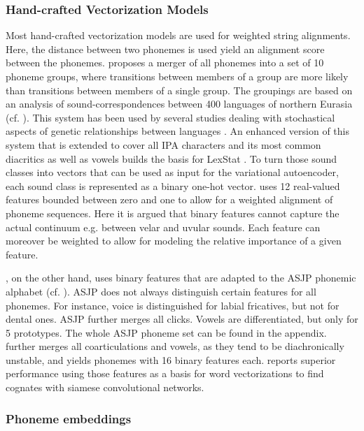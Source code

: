 \documentclass[6pt]{article}
\begin{document}
\subsubsection{Hand-crafted Vectorization Models}

Most hand-crafted vectorization models are used for weighted string alignments. Here, the distance between two phonemes is used yield an alignment score between the phonemes. \cite{dolgopolsky1986probabilistic} proposes a merger of all phonemes into a set of 10 phoneme groups, where transitions between  members of a group are more likely than transitions between members of a single group. The groupings are based on an analysis of sound-correspondences between 400 languages of northern Eurasia (cf. \cite[p. 119]{list2012lexstat}). This system has been used by several studies dealing with stochastical aspects of genetic relationships between languages \citep{baxter2000beyond,mortarino2009improved,turchin2010analyzing}. An enhanced version of this system that is extended to cover all IPA characters and its most common diacritics as well as vowels builds the basis for LexStat \citep{list2012sca,list2012lexstat}. To turn those sound classes into vectors that can be used as input for the variational autoencoder, each sound class is represented as a binary one-hot vector. \cite{kondrak2000new} uses 12 real-valued features bounded between zero and one to allow for a weighted alignment of phoneme sequences. Here it is argued that binary features cannot capture the actual continuum e.g. between velar and uvular sounds. Each feature can moreover be weighted to allow for modeling the relative importance of a given feature.


\cite{rama2016siamese}, on the other hand,  uses binary features that are adapted to the ASJP phonemic alphabet (cf. \cite{wichmann2010asjp}). ASJP does not always distinguish certain features for all phonemes. For instance, voice is distinguished for labial fricatives, but not for dental ones. ASJP further merges all clicks. Vowels are differentiated, but only for 5 prototypes. The whole ASJP phoneme set can be found in the appendix. \cite{rama2016siamese} further merges all coarticulations and vowels, as they tend to be diachronically unstable, and yields phonemes with 16 binary features each. \cite{rama2016siamese} reports superior performance using those features as a basis for word vectorizations to find cognates with siamese convolutional networks.
\subsubsection{Phoneme embeddings}
\label{Phoneme embeddings}
\end{document}
